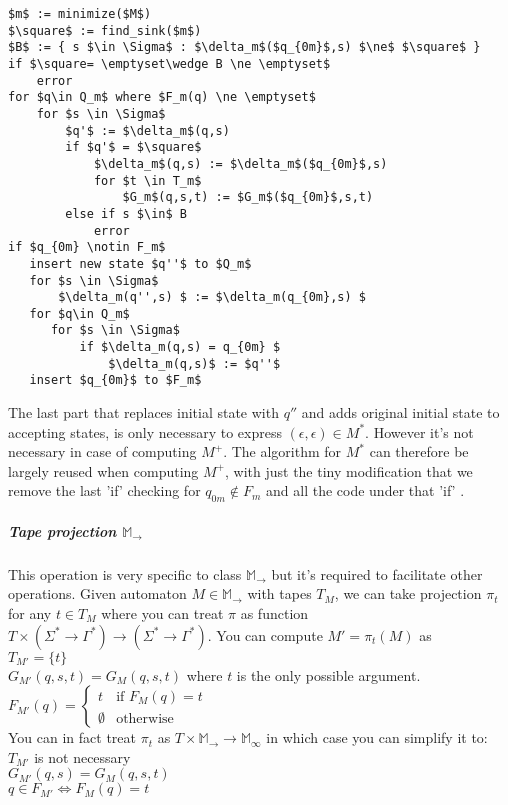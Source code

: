 \documentclass[12pt]{article}
\begin{document}
\begin{lstlisting}
$m$ := minimize($M$)
$\square$ := find_sink($m$)
$B$ := { s $\in \Sigma$ : $\delta_m$($q_{0m}$,s) $\ne$ $\square$ }
if $\square= \emptyset\wedge B \ne \emptyset$
    error
for $q\in Q_m$ where $F_m(q) \ne \emptyset$ 
    for $s \in \Sigma$
        $q'$ := $\delta_m$(q,s)
        if $q'$ = $\square$ 
            $\delta_m$(q,s) := $\delta_m$($q_{0m}$,s)
            for $t \in T_m$
                $G_m$(q,s,t) := $G_m$($q_{0m}$,s,t)
        else if s $\in$ B
            error
if $q_{0m} \notin F_m$
   insert new state $q''$ to $Q_m$
   for $s \in \Sigma$
       $\delta_m(q'',s) $ := $\delta_m(q_{0m},s) $
   for $q\in Q_m$
      for $s \in \Sigma$
          if $\delta_m(q,s) = q_{0m} $
              $\delta_m(q,s)$ := $q''$
   insert $q_{0m}$ to $F_m$
\end{lstlisting}
The last part that replaces initial state with $q''$ and adds original initial state to accepting states, is only necessary to express $(\epsilon,\epsilon) \in M^*$. However it's not necessary in case of computing $M^+$. The algorithm for $M^*$ can therefore be largely reused when computing $M^+$, with just the tiny modification that we remove the last 'if' checking for $q_{0m} \notin F_m$ and all the code under that 'if' .
  

\subparagraph{Tape projection $\mathbb{M}_\rightarrow$} This operation is very specific to class $\mathbb{M}_\rightarrow$ but it's required to facilitate other operations. Given automaton $M \in \mathbb{M}_\rightarrow$ with tapes $T_M$, we can take projection $\pi_t$ for any $t\in T_M$ where you can treat $\pi$ as function $T \times (\Sigma^* \rightarrow \Gamma^*) \rightarrow (\Sigma^* \rightarrow \Gamma^*)$. You can compute $M' = \pi_t(M)$ as \\
 $T_{M'} = \{t\}$ \\
 $G_{M'}(q,s,t) = G_M(q,s,t)$ where $t$ is the only possible argument. \\
 $F_{M'}(q) = \begin{cases}
 t & \mbox{if } F_M(q) = t \\
 \emptyset & \mbox{otherwise}
 \end{cases}$ \\
 You can in fact treat $\pi_t$ as $T \times \mathbb{M}_\rightarrow \rightarrow \mathbb{M}_\infty$ in which case you can simplify it to: \\
  $T_{M'}$ is not necessary \\
 $G_{M'}(q,s) = G_M(q,s,t)$ \\
 $q \in F_{M'} \iff F_M(q) = t$ \\
\end{document}
